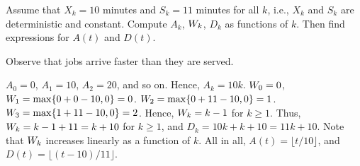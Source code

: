 \begin{exercise}\label{ex:25} 
  Assume that $X_k = 10$ minutes and $S_k = 11$ minutes for all $k$, i.e., $X_k$ and $S_k$ are deterministic and constant.
 Compute $A_k$, $W_k$, $D_k$ as functions of $k$.
  Then find expressions for $A(t)$ and $D(t)$.
\begin{hint}
Observe that jobs arrive faster than they are served.
\end{hint}
\begin{solution}
$A_0 = 0$, $A_1=10$, $A_2=20$, and so on. Hence,
 $A_k = 10k$. $W_{0} = 0$, $W_{1} = \max\{0 + 0-10,0\} = 0$.
 $W_{2} = \max\{0+11-10,0\} =1$.
 $W_{3} = \max\{1+11-10,0\} =2$. Hence, $W_{k} = k-1$ for
 $k\geq1$. Thus, $W_k = k-1+11 = k + 10$ for $k\geq1$, and
 $D_k = 10k + k+10 = 11k+10$. Note that $W_k$ increases linearly
 as a function of $k$. All in all, $A(t) = \lfloor t/10\rfloor$, and $D(t) = \lfloor (t-10)/11 \rfloor$.
\end{solution}
\end{exercise}


